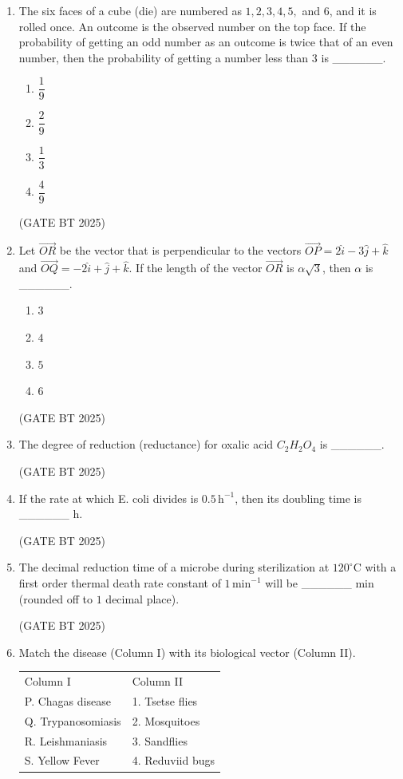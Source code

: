 \documentclass[journal,12pt,onecolumn]{IEEEtran}
\theoremstyle{remark}
\begin{document}
\begin{enumerate}
\item 
The six faces of a cube (die) are numbered as $1, 2, 3, 4, 5,$ and $6$, and it is rolled once. An outcome is the observed number on the top face. If the probability of getting an odd number as an outcome is twice that of an even number, then the probability of getting a number less than $3$ is \_\_\_\_\_\_.

\begin{enumerate}
    \item $\dfrac{1}{9}$
    \item $\dfrac{2}{9}$
    \item $\dfrac{1}{3}$
    \item $\dfrac{4}{9}$
\end{enumerate}
\hfill(GATE BT 2025)

\item 
Let $\vec{OR}$ be the vector that is perpendicular to the vectors $\vec{OP}=2\hat{i}-3\hat{j}+\hat{k}$ and $\vec{OQ}=-2\hat{i}+\hat{j}+\hat{k}$. If the length of the vector $\vec{OR}$ is $\alpha\sqrt{3}$, then $\alpha$ is \_\_\_\_\_\_.

\begin{enumerate}
    \item $3$
    \item $4$
    \item $5$
    \item $6$
\end{enumerate}
\hfill(GATE BT 2025)

\item 
The degree of reduction (reductance) for oxalic acid $C_2H_2O_4$ is \_\_\_\_\_\_.

\hfill(GATE BT 2025)

\item 
If the rate at which E. coli divides is $0.5\,\text{h}^{-1}$, then its doubling time is \_\_\_\_\_\_ h.

\hfill(GATE BT 2025)

\item 
The decimal reduction time of a microbe during sterilization at $120^\circ\text{C}$ with a first order thermal death rate constant of $1\,\text{min}^{-1}$ will be \_\_\_\_\_\_ min (rounded off to $1$ decimal place).

\hfill(GATE BT 2025)

\item 
Match the disease (Column I) with its biological vector (Column II).

\begin{tabular}{ll}
Column I & Column II \\
P. Chagas disease & 1. Tsetse flies \\
Q. Trypanosomiasis & 2. Mosquitoes \\
R. Leishmaniasis & 3. Sandflies \\
S. Yellow Fever & 4. Reduviid bugs \\
\end{tabular}


\end{enumerate}
\end{document}
